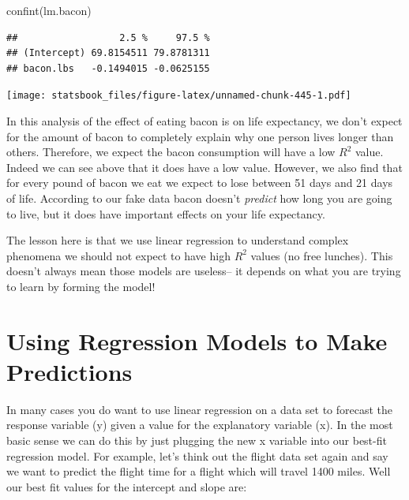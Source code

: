 \documentclass[
]{book}
\newenvironment{Shaded}{\begin{snugshade}}{\end{snugshade}}
\newcommand{\AttributeTok}[1]{\textcolor[rgb]{0.77,0.63,0.00}{#1}}
\newcommand{\FunctionTok}[1]{\textcolor[rgb]{0.00,0.00,0.00}{#1}}
\newcommand{\NormalTok}[1]{#1}
\newcommand{\SpecialCharTok}[1]{\textcolor[rgb]{0.00,0.00,0.00}{#1}}
\newcommand{\StringTok}[1]{\textcolor[rgb]{0.31,0.60,0.02}{#1}}
\theoremstyle{definition}
\theoremstyle{definition}
\theoremstyle{definition}
\theoremstyle{definition}
\theoremstyle{remark}
\begin{document}
\begin{Shaded}
\begin{Highlighting}[]
\FunctionTok{confint}\NormalTok{(lm.bacon)}
\end{Highlighting}
\end{Shaded}

\begin{verbatim}
##                  2.5 %     97.5 %
## (Intercept) 69.8154511 79.8781311
## bacon.lbs   -0.1494015 -0.0625155
\end{verbatim}

\begin{Shaded}
\end{Shaded}

\texttt{[image: statsbook\_files/figure-latex/unnamed-chunk-445-1.pdf]}

In this analysis of the effect of eating bacon is on life expectancy, we don't expect for the amount of bacon to completely explain why one person lives longer than others. Therefore, we expect the bacon consumption will have a low \(R^2\) value. Indeed we can see above that it does have a low value. However, we also find that for every pound of bacon we eat we expect to lose between 51 days and 21 days of life. According to our fake data bacon doesn't \emph{predict} how long you are going to live, but it does have important effects on your life expectancy.

The lesson here is that we use linear regression to understand complex phenomena we should not expect to have high \(R^2\) values (no free lunches). This doesn't always mean those models are useless-- it depends on what you are trying to learn by forming the model!

\hypertarget{using-regression-models-to-make-predictions}{%
\section{Using Regression Models to Make Predictions}\label{using-regression-models-to-make-predictions}}

In many cases you do want to use linear regression on a data set to forecast the response variable (y) given a value for the explanatory variable (x). In the most basic sense we can do this by just plugging the new x variable into our best-fit regression model. For example, let's think out the flight data set again and say we want to predict the flight time for a flight which will travel 1400 miles. Well our best fit values for the intercept and slope are:
\end{document}
